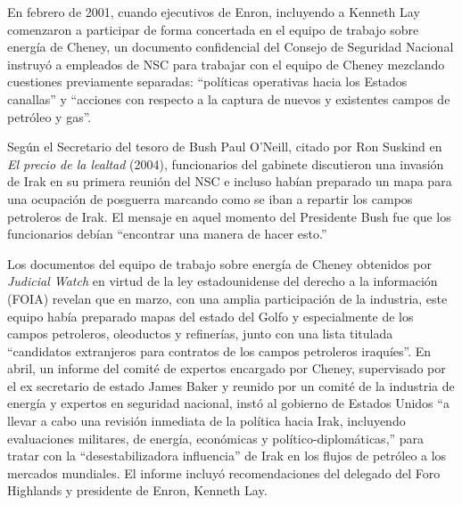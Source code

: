 \documentclass[10pt,a5paper,twoside,spanish,]{book}
\begin{document}
En febrero de 2001, cuando ejecutivos de Enron, incluyendo a Kenneth Lay
comenzaron a participar de forma concertada en el equipo de trabajo
sobre energía de Cheney, un documento confidencial del Consejo de
Seguridad Nacional instruyó a empleados de NSC para trabajar con el
equipo de Cheney mezclando cuestiones previamente separadas: ``políticas
operativas hacia los Estados canallas'' y ``acciones con respecto a la
captura de nuevos y existentes campos de petróleo y gas''.

Según el Secretario del tesoro de Bush Paul O'Neill, citado por Ron
Suskind en \emph{El precio de la lealtad} (2004), funcionarios del
gabinete discutieron una invasión de Irak en su primera reunión del NSC
e incluso habían preparado un mapa para una ocupación de posguerra
marcando como se iban a repartir los campos petroleros de Irak. El
mensaje en aquel momento del Presidente Bush fue que los funcionarios
debían ``encontrar una manera de hacer esto.''

Los documentos del equipo de trabajo sobre energía de Cheney obtenidos
por \emph{Judicial Watch} en virtud de la ley estadounidense del derecho
a la información (FOIA) revelan que en marzo, con una amplia
participación de la industria, este equipo había preparado mapas del
estado del Golfo y especialmente de los campos petroleros, oleoductos y
refinerías, junto con una lista titulada ``candidatos extranjeros para
contratos de los campos petroleros iraquíes''. En abril, un informe del
comité de expertos encargado por Cheney, supervisado por el ex
secretario de estado James Baker y reunido por un comité de la industria
de energía y expertos en seguridad nacional, instó al gobierno de
Estados Unidos ``a llevar a cabo una revisión inmediata de la política
hacia Irak, incluyendo evaluaciones militares, de energía, económicas y
político-diplomáticas,'' para tratar con la ``desestabilizadora
influencia'' de Irak en los flujos de petróleo a los mercados mundiales.
El informe incluyó recomendaciones del delegado del Foro Highlands y
presidente de Enron, Kenneth Lay.
\end{document}
